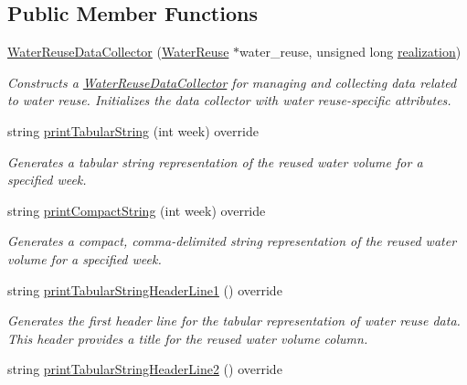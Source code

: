 \subsection*{Public Member Functions}
\begin{DoxyCompactItemize}
\item 
\mbox{\hyperlink{classWaterReuseDataCollector_a0bd64f585d6645023f6cf5a485a89416}{Water\+Reuse\+Data\+Collector}} (\mbox{\hyperlink{classWaterReuse}{Water\+Reuse}} $\ast$water\+\_\+reuse, unsigned long \mbox{\hyperlink{classDataCollector_a9ef2887466fe3123aa19ef956a219b96}{realization}})
\begin{DoxyCompactList}\small\item\em Constructs a {\ttfamily \mbox{\hyperlink{classWaterReuseDataCollector}{Water\+Reuse\+Data\+Collector}}} for managing and collecting data related to water reuse. Initializes the data collector with water reuse-\/specific attributes. \end{DoxyCompactList}\item 
string \mbox{\hyperlink{classWaterReuseDataCollector_af8b637ad080f354dc145f11580834da8}{print\+Tabular\+String}} (int week) override
\begin{DoxyCompactList}\small\item\em Generates a tabular string representation of the reused water volume for a specified week. \end{DoxyCompactList}\item 
string \mbox{\hyperlink{classWaterReuseDataCollector_a6b37aa4b2031cf0a1a1326da2bd64420}{print\+Compact\+String}} (int week) override
\begin{DoxyCompactList}\small\item\em Generates a compact, comma-\/delimited string representation of the reused water volume for a specified week. \end{DoxyCompactList}\item 
string \mbox{\hyperlink{classWaterReuseDataCollector_a1065ad3627b913dccb6ecbf0e6acc6e6}{print\+Tabular\+String\+Header\+Line1}} () override
\begin{DoxyCompactList}\small\item\em Generates the first header line for the tabular representation of water reuse data. This header provides a title for the reused water volume column. \end{DoxyCompactList}\item 
string \mbox{\hyperlink{classWaterReuseDataCollector_a8cead3771efabeb62dcf069008810f43}{print\+Tabular\+String\+Header\+Line2}} () override

\end{DoxyCompactItemize}
